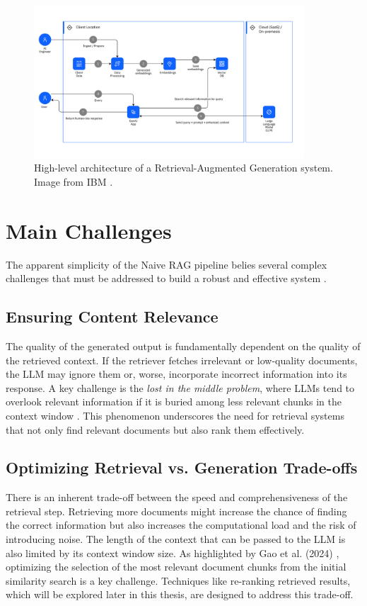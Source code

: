 \begin{figure}[!htbp]
    \centering
    \includegraphics[width=0.9\textwidth]{images/chapter2/rag_architecture.png}
    \caption{High-level architecture of a Retrieval-Augmented Generation system. Image from IBM \autocite{ibm-rag-pattern}.}
    \label{fig:rag_architecture}
\end{figure}

\section{Main Challenges}
The apparent simplicity of the Naive RAG pipeline belies several complex challenges that must be addressed to build a robust and effective system \autocite{gao2024retrievalaugmented}.

\subsection{Ensuring Content Relevance}
The quality of the generated output is fundamentally dependent on the quality of the retrieved context. If the retriever fetches irrelevant or low-quality documents, the LLM may ignore them or, worse, incorporate incorrect information into its response. A key challenge is the \textit{lost in the middle problem}, where LLMs tend to overlook relevant information if it is buried among less relevant chunks in the context window \autocite{liu2023lost}. This phenomenon underscores the need for retrieval systems that not only find relevant documents but also rank them effectively.

\subsection{Optimizing Retrieval vs. Generation Trade-offs}
There is an inherent trade-off between the speed and comprehensiveness of the retrieval step. Retrieving more documents might increase the chance of finding the correct information but also increases the computational load and the risk of introducing noise. The length of the context that can be passed to the LLM is also limited by its context window size. As highlighted by Gao et al. (2024) \autocite{gao2024retrievalaugmented}, optimizing the selection of the most relevant document chunks from the initial similarity search is a key challenge. Techniques like re-ranking retrieved results, which will be explored later in this thesis, are designed to address this trade-off.

